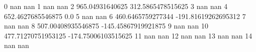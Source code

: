 0 nan nan
1 nan nan
2 965.04931640625 312.5865478515625
3 nan nan
4 652.4627685546875 0.0
5 nan nan
6 460.6465759277344 -191.81619262695312
7 nan nan
8 507.00408935546875 -145.45867919921875
9 nan nan
10 477.71270751953125 -174.75006103515625
11 nan nan
12 nan nan
13 nan nan
14 nan nan
